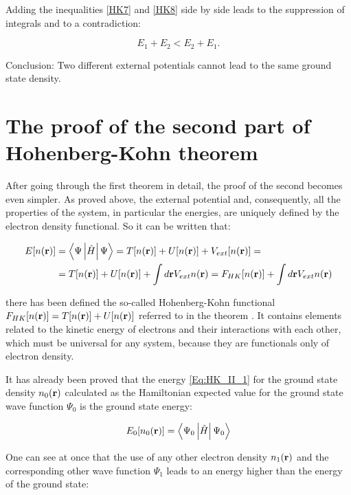 Adding the inequalities \ref{HK7} and \ref{HK8} side by side leads to the suppression of integrals and to a contradiction:

\begin{equation}
\label{HK9}
E_1+E_2<E_2+E_1.
\end{equation}

Conclusion: Two different external potentials cannot lead to the same ground state density.

\ornament

\section*{The proof of the second part of Hohenberg-Kohn theorem}
\label{chap:derivations_hk2}
After going through the first theorem in detail, the proof of the second becomes even simpler.
As proved above, the external potential and, consequently, all the properties of the system, in particular the energies, are uniquely defined by the electron density functional.
So it can be written that:

\begin{equation}
\begin{aligned}
\label{Eq:HK_II_1}
E[n(\mathbf{r})]&=\left<\Psi\left|\hat{H}\right|\Psi\right>=T[n(\mathbf{r})]+U[n(\mathbf{r})]+V_{ext}[n(\mathbf{r})]=\\
&=T[n(\mathbf{r})]+U[n(\mathbf{r})]+\int d\mathbf{r}V_{ext}n(\mathbf{r})=F_{HK}[n(\mathbf{r})]+\int d\mathbf{r}V_{ext}n(\mathbf{r})
\end{aligned}
\end{equation}

there has been defined the so-called Hohenberg-Kohn functional $F_{HK}[n(\mathbf{r})]=T[n(\mathbf{r})]+U[n(\mathbf{r})]$ referred to in the theorem .
It contains elements related to the kinetic energy of electrons and their interactions with each other, which must be universal for any system, because they are functionals only of electron density.

It has already been proved that the energy \ref{Eq:HK_II_1} for the ground state density $n_0(\mathbf{r})$ calculated as the Hamiltonian expected value for the ground state wave function $\Psi_0$ is the ground state energy:

\begin{equation}
\label{Eq:HK_II_2}
E_0[n_0(\mathbf{r})]=\left<\Psi_0\left|\hat{H}\right|\Psi_0\right>
\end{equation}

One can see at once that the use of any other electron density $n_1(\mathbf{r})$ and the corresponding other wave function $\Psi_1$ leads to an energy higher than the energy of the ground state:

